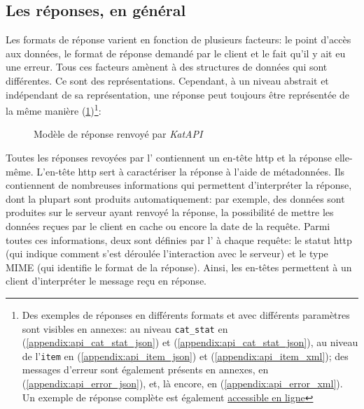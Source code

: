 \subsection{Les réponses, en général}
Les formats de réponse varient en fonction de plusieurs facteurs: le point d'accès aux données, le format de réponse demandé par le client et le fait qu'il y ait eu une erreur. Tous ces facteurs amènent à des structures de données qui sont différentes. Ce sont des représentations. Cependant, à un niveau abstrait et indépendant de sa représentation, une réponse peut toujours être représentée de la même manière (\ref{fig:response})\footnote{
	Des exemples de réponses en différents formats et avec différents paramètres sont visibles en annexes: au niveau \texttt{cat\_stat} en \json{} (\ref{appendix:api_cat_stat_json}) et \tei{} (\ref{appendix:api_cat_stat_json}), au niveau de l'\texttt{item} en \json{} (\ref{appendix:api_item_json}) et \tei{} (\ref{appendix:api_item_xml}); des messages d'erreur sont également présents en annexes, en \json{} (\ref{appendix:api_error_json}), et, là encore, en \tei{} (\ref{appendix:api_error_xml}). Un exemple de réponse complète est également \href{}{accessible en ligne} 
}:

\begin{figure}[h!]
	\caption{Modèle de réponse renvoyé par \textit{KatAPI}}
	\label{fig:response}
\end{figure}

Toutes les réponses revoyées par l'\api{} contiennent un en-tête \gls{http} et la réponse elle-même. L'en-tête \gls{http} sert à caractériser la réponse à l'aide de métadonnées. Ils contiennent de nombreuses informations qui permettent d'interpréter la réponse, dont la plupart sont produits automatiquement: par exemple, des données sont produites sur le serveur ayant renvoyé la réponse, la possibilité de mettre les données reçues par le client en cache ou encore la date de la requête. Parmi toutes ces informations, deux sont définies par l'\api{} à chaque requête: le statut \gls{http} (qui indique comment s'est déroulée l'interaction avec le serveur) et le type MIME (qui identifie le format de la réponse). Ainsi, les en-têtes permettent à un client d'interpréter le message reçu en réponse.

